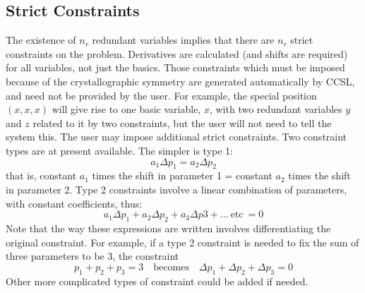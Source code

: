 \subsection{Strict Constraints}
% 
The existence of $n_r$ redundant variables implies that there are $n_r$
strict constraints on the problem. Derivatives are calculated 
(and shifts are required) for all
variables, not just the basics.
\p
Those constraints which must be imposed because of the crystallographic
symmetry are generated automatically by CCSL, and need not be provided by
the user.  For example, the  special position $(x,x,x)$ will give rise to
one basic variable, $x$, with two redundant variables $y$ and $z$ related to
it by two constraints, but the user will not need to tell the system
this.\p
The user may impose additional strict constraints.  Two constraint types
are at present available.  The simpler is type 1:
             $$a_1\Delta p_1 = a_2\Delta p_2$$
that is, constant $a_1$ times the shift in parameter 1 = constant $a_2$ times
the shift in parameter 2.\p
Type 2 constraints involve a linear combination of parameters, with
constant coefficients, thus:
 $$  a_1\Delta p_1 + a_2\Delta p_2 + a_3\Delta p3 + \ldots\ \mbox{etc}\
   = 0$$
Note that the way these expressions are written involves differentiating
the original constraint.  For example, if a type 2 constraint is
needed to fix the sum of three parameters to be 3, the constraint
$$p_1 + p_2 + p_3 = 3\quad\mbox{becomes}\quad \Delta p_1 + 
\Delta p_2 + \Delta p_3 = 0$$
Other more complicated types of constraint could be added if needed.
%
